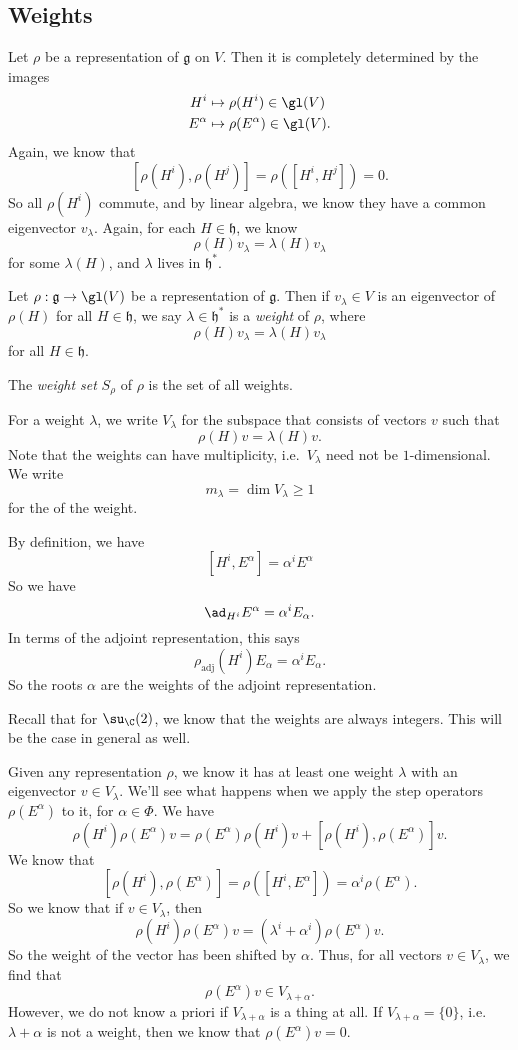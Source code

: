 \documentclass[a4paper]{article}
\begin{document}
\subsection{Weights}
Let $\rho$ be a representation of $\mathfrak{g}$ on $V$. Then it is completely determined by the images
\begin{align*}
  H^i &\mapsto \rho(H^i) \in \gl(V)\\
  E^\alpha &\mapsto \rho(E^\alpha) \in \gl(V).
\end{align*}
Again, we know that
\[
  [\rho(H^i), \rho(H^j)] = \rho([H^i, H^j]) = 0.
\]
So all $\rho(H^i)$ commute, and by linear algebra, we know they have a common eigenvector $v_\lambda$. Again, for each $H \in \mathfrak{h}$, we know
\[
  \rho(H) v_\lambda = \lambda(H) v_\lambda
\]
for some $\lambda(H)$, and $\lambda$ lives in $\mathfrak{h}^*$.
\begin{defi}
  Let $\rho: \mathfrak{g} \to \gl(V)$ be a representation of $\mathfrak{g}$. Then if $v_\lambda \in V$ is an eigenvector of $\rho(H)$ for all $H \in \mathfrak{h}$, we say $\lambda\in \mathfrak{h}^*$ is a \emph{weight} of $\rho$, where
  \[
    \rho(H) v_\lambda = \lambda(H) v_\lambda
  \]
  for all $H \in \mathfrak{h}$.

  The \emph{weight set} $S_\rho$ of $\rho$ is the set of all weights.
\end{defi}
For a weight $\lambda$, we write $V_\lambda$ for the subspace that consists of vectors $v$ such that
\[
  \rho(H) v = \lambda(H) v.
\]
Note that the weights can have multiplicity, i.e.\ $V_\lambda$ need not be $1$-dimensional. We write
\[
  m_\lambda = \dim V_\lambda \geq 1
\]
for the  of the weight.

\begin{eg}
  By definition, we have
  \[
    [H^i, E^\alpha] = \alpha^i E^\alpha
  \]
  So we have
  \[
    \ad_{H^i} E^\alpha = \alpha^i E_\alpha.
  \]
  In terms of the adjoint representation, this says
  \[
    \rho_{\mathrm{adj}} (H^i) E_\alpha = \alpha^i E_\alpha.
  \]
  So the roots $\alpha$ are the weights of the adjoint representation.
\end{eg}
Recall that for $\su_\C(2)$, we know that the weights are always integers. This will be the case in general as well.

Given any representation $\rho$, we know it has at least one weight $\lambda$ with an eigenvector $v \in V_\lambda$. We'll see what happens when we apply the step operators $\rho(E^\alpha)$ to it, for $\alpha \in \Phi$. We have
\[
  \rho(H^i) \rho(E^\alpha)v = \rho(E^\alpha) \rho(H^i) v + [\rho(H^i), \rho(E^\alpha)] v.
\]
We know that
\[
  [\rho(H^i), \rho(E^\alpha)] = \rho([H^i, E^\alpha]) = \alpha^i \rho(E^\alpha).
\]
So we know that if $v \in V_\lambda$, then
\[
  \rho(H^i)\rho(E^\alpha)v = (\lambda^i + \alpha^i) \rho(E^\alpha) v.
\]
So the weight of the vector has been shifted by $\alpha$. Thus, for all vectors $v \in V_\lambda$, we find that
\[
  \rho(E^\alpha) v \in V_{\lambda + \alpha}.
\]
However, we do not know a priori if $V_{\lambda + \alpha}$ is a thing at all. If $V_{\lambda + \alpha} = \{0\}$, i.e.\ $\lambda + \alpha$ is not a weight, then we know that $\rho(E^\alpha) v = 0$.
\end{document}
